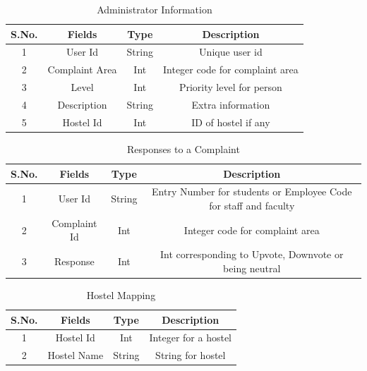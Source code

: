 \documentclass{article}
\begin{document}
\begin{table}[!htb]
\centering
\caption{Administrator Information}
\label{my-label}
\begin{tabular}{|c|c|c|c|}
\hline
\textbf{S.No.} & \textbf{Fields} & \textbf{Type} & \textbf{Description}                                             \\ \hline
1              & User Id         & String        & Unique user id \\ \hline
2              & Complaint Area  & Int           & Integer code for complaint area                                  \\ \hline
3              & Level           & Int           & Priority level for person                                        \\ \hline
4              & Description     & String        & Extra information                                                \\ \hline
5 				& Hostel Id  & Int & ID of hostel if any \\ \hline
\end{tabular}
\end{table}



\begin{table}[!htb]
\centering
\caption{Responses to a Complaint}
\label{my-label}
\begin{tabular}{|c|c|c|c|}
\hline
\textbf{S.No.} & \textbf{Fields} & \textbf{Type} & \textbf{Description}                                             \\ \hline
1              & User Id         & String        & Entry Number for students or Employee Code for staff and faculty \\ \hline
2              & Complaint Id    & Int           & Integer code for complaint area                                  \\ \hline
3              & Response         & Int           & Int corresponding to Upvote, Downvote or being neutral           \\ \hline
\end{tabular}
\end{table}


\begin{table}[!htb]
\centering
\caption{Hostel Mapping}
\label{my-label}
\begin{tabular}{|c|c|c|c|}
\hline
\textbf{S.No.} & \textbf{Fields} & \textbf{Type} & \textbf{Description} \\ \hline
1              & Hostel Id       & Int           & Integer for a hostel \\ \hline
2              & Hostel Name     & String        & String for hostel    \\ \hline
\end{tabular}
\end{table}
\end{document}
